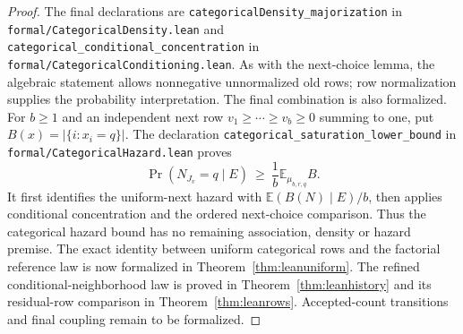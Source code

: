 \documentclass[11pt]{article}
\begin{document}
\begin{proof}
The final declarations are \texttt{categoricalDensity\_majorization} in
\texttt{formal/CategoricalDensity.lean} and
\texttt{categorical\_conditional\_concentration} in
\texttt{formal/CategoricalConditioning.lean}. As with the next-choice
lemma, the algebraic statement allows nonnegative unnormalized old rows;
row normalization supplies the probability interpretation. The final combination is also formalized. For $b\geq1$ and an independent
next row $v_1\geq\cdots\geq v_b\geq0$ summing to one, put
$B(x)=|\{i:x_i=q\}|$. The declaration
\texttt{categorical\_saturation\_lower\_bound} in
\texttt{formal/CategoricalHazard.lean} proves
\[
 \Pr(N_{J_v}=q\mid E)\ \geq\ \frac1b\mathbb E_{\mu_{b,r,q}}B.
\]
It first identifies the uniform-next hazard with
$\mathbb E(B(N)\mid E)/b$, then applies conditional concentration and the
ordered next-choice comparison. Thus the categorical hazard bound has
no remaining association, density or hazard premise. The exact identity
between uniform categorical rows and the factorial reference law is now
formalized in Theorem~\ref{thm:leanuniform}. The refined conditional-neighborhood law is proved in
Theorem~\ref{thm:leanhistory} and its residual-row comparison in
Theorem~\ref{thm:leanrows}. Accepted-count transitions and final coupling
remain to be formalized.
\end{proof}
\end{document}
